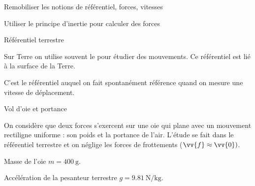 \teteSndMouv
{}

\begin{objectifs}
  \item Remobiliser les notions de référentiel, forces, vitesses
  \item Utiliser le principe d'inertie pour calculer des forces
\end{objectifs}


\begin{doc}{Référentiel terrestre}
  \begin{importants}
    Sur Terre on utilise souvent le  pour étudier des mouvements. Ce référentiel est lié à la surface de la Terre.
  \end{importants}
  C'est le référentiel auquel on fait spontanément référence quand on mesure une vitesse de déplacement.
\end{doc}



\begin{doc}{Vol d'oie et portance}
  \begin{center}
  \end{center}
  
  
  On considère que deux forces s'exercent sur une oie qui plane avec un mouvement rectiligne uniforme : son poids et la portance de l'air.
  L'étude se fait dans le référentiel terrestre et on néglige les forces de frottements ($\vv{f} \approx \vv{0})$.

  \begin{listePoints}
    \item Masse de l'oie $m = \qty{400}{\g}$.
    \item Accélération de la pesanteur terrestre $g = \qty{9,81}{\newton \per\kg}$.
  \end{listePoints}
\end{doc}



